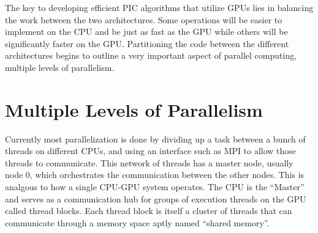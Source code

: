 The key to developing efficient PIC algorithms that utilize GPUs lies in balancing the work between the two architectures. Some operations will be easier to implement on the CPU and be just as fast as the GPU while others will be significantly faster on the GPU. Partitioning the code between the different architectures begins to outline a very important aspect of parallel computing, multiple levels of parallelism.

	\section{Multiple Levels of Parallelism}
	Currently most parallelization is done by dividing up a task between a bunch of threads on different CPUs, and using an interface such as MPI to allow those threads to communicate. This network of threads has a master node, usually node 0, which orchestrates the communication between the other nodes. This is analgous to how a single CPU-GPU system operates. The CPU is the ``Master'' and serves as a communication hub for groups of execution threads on the GPU called thread blocks. Each thread block is itself a cluster of threads that can communicate through a memory space aptly named ``shared memory''.


